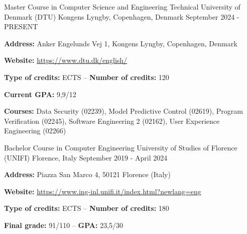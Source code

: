 

\begin{cventries}

  \cventry
    {Master Course in Computer Science and Engineering} %
    {Technical University of Denmark (DTU)} %
    {Kongens Lyngby, Copenhagen, Denmark} %
    {September 2024 - PRESENT} %
    {
      \begin{cvitems} %
        \item {\textbf{Address:} Anker Engelunds Vej 1, Kongens Lyngby, Copenhagen, Denmark}
        \item {\textbf{Website:} \href{https://www.dtu.dk/english/}{https://www.dtu.dk/english/}}
        \item {\textbf{Type of credits:} ECTS – \textbf{Number of credits:} 120}
        \item {\textbf{Current GPA:} 9,9/12}
        \item {\textbf{Courses:} Data Security (02239), Model Predictive Control (02619), Program Verification (02245), Software Engineering 2 (02162), User Experience Engineering (02266)}
      \end{cvitems}
    }

  \cventry
    {Bachelor Course in Computer Engineering} %
    {University of Studies of Florence (UNIFI)} %
    {Florence, Italy} %
    {September 2019 - April 2024} %
    {
      \begin{cvitems} %
        \item {\textbf{Address:} Piazza San Marco 4, 50121 Florence (Italy)}
        \item {\textbf{Website:} \href{https://www.ing-inl.unifi.it/index.html?newlang=eng}{https://www.ing-inl.unifi.it/index.html?newlang=eng}}
        \item {\textbf{Type of credits:} ECTS – \textbf{Number of credits:} 180}
        \item {\textbf{Final grade:} 91/110 – \textbf{GPA:} 23,5/30}
      \end{cvitems}
    }


\end{cventries}

